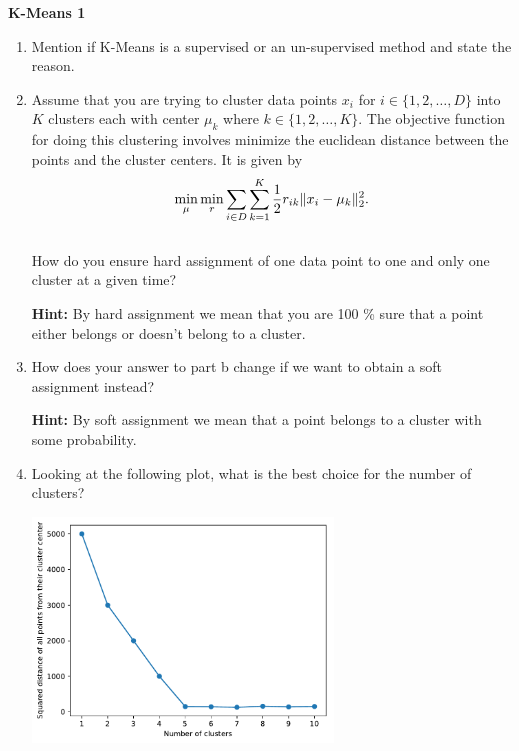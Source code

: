 \begin{Q}
\textbf{\Large K-Means 1}\\

\begin{enumerate}

\item Mention if K-Means is a supervised or an un-supervised method and state the reason.

\item Assume that you are trying to cluster data points $x_{i}$  for $ i \in \{1,2, \dots, D\}$ into $K$ clusters each with center $\mu_{k}$  where $ k \in \{1,2, \dots, K \}$. The objective function for doing this clustering involves minimize the euclidean distance between the points and the cluster centers. It is given by  \begin{equation*}
\min\limits_{\mu} \min\limits_{r}\sum\limits_{i \in D} \sum\limits_{k =1}^{K} \frac{1}{2} r_{ik} \|x_{i} -\mu_{k}\|_{2}^{2}. \\
 \end{equation*} \\ How do you ensure hard assignment of one data point to one and only one cluster at a given time?
 
 \textbf{Hint:} By hard assignment we mean that you are 100 \% sure that a point either belongs or doesn't belong to a cluster.
 
 \item How does your answer to part b change if we want to obtain a soft assignment instead?
 
 \textbf{Hint:} By soft assignment we mean that  a point  belongs to a cluster with some probability.
 
 \item Looking at the following plot, what is the best choice for the number of clusters?
 \begin{center}
 \includegraphics[width=8cm]{figs/cluster.pdf}
 \end{center}
 

\end{enumerate}
\end{Q}

